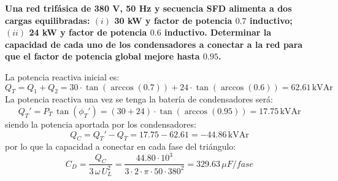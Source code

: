 		\begin{example}\label{ex.compensacion_Q_trif}
		    \textbf{Una red trifásica de 380 V, 50 Hz y secuencia SFD alimenta a dos cargas equilibradas: $(i)$ 30 kW y factor de potencia $0.7$ inductivo; $(ii)$ 24 kW y factor de potencia $0.6$ inductivo. Determinar la capacidad de cada uno de los condensadores a conectar a la red para que el factor de potencia global mejore hasta $0.95$.}
		    
		    La potencia reactiva inicial es:
		    \begin{equation*}
		        Q_T=Q_1+Q_2=30\cdot \tan(\arccos(0.7))+24\cdot \tan(\arccos(0.6))=62.61\,\text{kVAr}
		    \end{equation*}
		    La potencia reactiva una vez se tenga la batería de condensadores será: 
		    \begin{equation*}
		        Q_T'=P_T\,\tan(\phi_T')=(30+24)\cdot \tan(\arccos(0.95))=17.75\,\text{kVAr}
		    \end{equation*}
		    siendo la potencia aportada por los condensadores:
		    \begin{equation*}
		        Q_C=Q_T'-Q_T=17.75-62.61=-44.86\,\text{kVAr}
		    \end{equation*}
		    por lo que la capacidad a conectar en cada fase del triángulo: 
		    \begin{equation*}
		     C_D=\dfrac{Q_C}{3\,\omega\,U_L^2}=\dfrac{44.80\cdot 10^3}{3\cdot 2\cdot \pi\cdot 50\cdot 380^2}=329.63\,\mu F/fase
		    \end{equation*}
		\end{example}

		 
	
	
	
	

